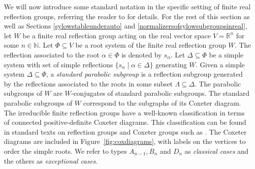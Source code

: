 \documentclass[12pt]{amsart}
\theoremstyle{plain}
\theoremstyle{definition}
\numberwithin{equation}{section}
\newcommand{\N}{\mathbb{N}}
\numberwithin{equation}{section}
\begin{document}
	We will now introduce some standard notation in the specific setting of finite real reflection groups, referring the reader to \cite[Chap. 1-2]{JEH} for details. For the rest of this section as well as Sections \ref{sylowstableunderauto} and \ref{normalizersofsylowsubgroupsinreal}, let $W$ be a finite real reflection group acting on the real vector space $V=\mathbb{R}^n$ for some $n\in \N$. Let $\Phi\subseteq V$ be a root system of the finite real reflection group $W$. The reflection associated to the root $\alpha\in \Phi$ is denoted by $s_\alpha$. Let $\Delta\subseteq \Phi$ be a simple system with set of simple reflections $\{s_\alpha \mid \alpha\in \Delta\}$ generating $W$. Given a simple system $\Delta\subseteq\Phi$, a \emph{standard parabolic subgroup} is a reflection subgroup generated by the reflections associated to the roots in some subset $\Lambda\subseteq \Delta$. The parabolic subgroups of $W$ are $W$-conjugates of standard parabolic subgroups. The standard parabolic subgroups of $W$ correspond to the subgraphs of its Coxeter diagram. The irreducible finite reflection groups have a well-known classification in terms of connected positive-definite Coxeter diagrams. This classification can be found in standard texts on reflection groups and Coxeter groups such as \cite[2.5-2.7]{JEH}. The Coxeter diagrams are included in Figure~\ref{fig:coxdiagrams}, with labels on the vertices to order the simple roots. We refer to types $A_{n-1}, B_n$ and $D_n$ as \emph{classical cases} and the others as \emph{exceptional cases}.
	
\end{document}
